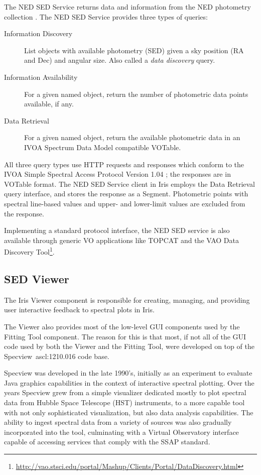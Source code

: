 \documentclass[preprint,authoryear,5p]{elsarticle}
\begin{document}
\begin{sloppypar}
The NED SED Service returns data and information from the NED photometry
collection \citep{2007ASPC..376..153M}. The NED SED Service provides three types
of queries:
\end{sloppypar}

\begin{description}
\item[Information Discovery] List objects with
available photometry (SED) given a sky position (RA and Dec) and angular size.
Also called a \emph{data discovery} query. 
\item[Information Availability] For
a given named object, return the number of photometric data points 
a\-vail\-a\-ble, if any.
\item[Data Retrieval] For a given named object, return the
available photometric data in an IVOA Spectrum Data Model compatible VOTable.
\end{description}

All three query types use HTTP requests and responses which conform to the 
IVOA Simple Spectral Access Protocol Version 1.04 \citep[SSAP;][]{2012arXiv1203.5725T}; 
the responses are in VOTable format. The NED SED Service client in Iris
employs the Data Retrieval query interface, and stores the
response as a Segment. Photometric points with spectral line-based values and
upper- and lower-limit values are excluded from the response.

Implementing a standard protocol interface, the NED SED service is also
available through generic VO applications like TOPCAT and the VAO Data Discovery
Tool\footnote{\url{http://vao.stsci.edu/portal/Mashup/Clients/Portal/DataDiscovery.html}}.

\subsection{SED Viewer} \label{subsec:specview}
The Iris Viewer component is responsible for creating, managing, and providing
user interactive feedback to spectral plots in Iris.

The Viewer also provides most of the low-level GUI
components used by the Fitting Tool component. The reason for this is that most,
if not all of the GUI code used by both the Viewer and the Fitting Tool, were
developed on top of the Specview~ascl:1210.016 \citep{2002ASPC..281..120B} code base.

Specview was developed in the late 1990's, initially as an experiment to evaluate
Java graphics capabilities in the context of interactive spectral plotting. Over
the years Specview grew from a simple visualizer dedicated mostly to plot
spectral data from Hubble Space Telescope (HST) instruments, to a more capable
tool with not only sophisticated visualization, but also data analysis
capabilities. The ability to ingest spectral data from a variety of sources was
also gradually incorporated into the tool, culminating with a Virtual
Observatory interface capable of accessing services that comply with the
SSAP standard.
\end{document}
